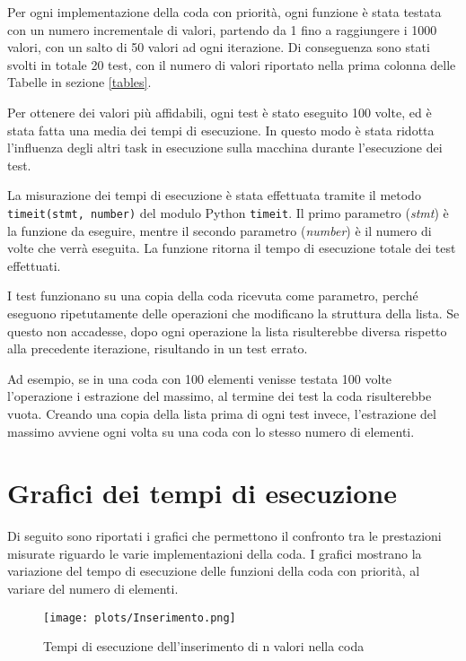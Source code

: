 \documentclass{article}
\begin{document}
Per ogni implementazione della coda con priorità, ogni funzione è stata testata con un numero incrementale di valori, partendo da 1 fino a raggiungere i 1000 valori, con un salto di 50 valori ad ogni iterazione. Di conseguenza sono stati svolti in totale 20 test, con il numero di valori riportato nella prima colonna delle Tabelle in sezione \ref{tables}.

\vspace{5pt}
Per ottenere dei valori più affidabili, ogni test è stato eseguito 100 volte, ed è stata fatta una media dei tempi di esecuzione. In questo modo è stata ridotta l'influenza degli altri task in esecuzione sulla macchina durante l'esecuzione dei test.

\vspace{5pt}
La misurazione dei tempi di esecuzione è stata effettuata tramite il metodo \verb|timeit(stmt, number)| del modulo Python \verb|timeit|. Il primo parametro (\emph{stmt}) è la funzione da eseguire, mentre il secondo parametro (\emph{number}) è il numero di volte che verrà eseguita. La funzione ritorna il tempo di esecuzione totale dei test effettuati.

\vspace{5pt}
I test funzionano su una copia della coda ricevuta come parametro, perché eseguono ripetutamente delle operazioni che modificano la struttura della lista. Se questo non accadesse, dopo ogni operazione la lista risulterebbe diversa rispetto alla precedente iterazione, risultando in un test errato.

Ad esempio, se in una coda con 100 elementi venisse testata 100 volte l'operazione i estrazione del massimo, al termine dei test la coda risulterebbe vuota. Creando una copia della lista prima di ogni test invece, l'estrazione del massimo avviene ogni volta su una coda con lo stesso numero di elementi.

\section{Grafici dei tempi di esecuzione}\label{grafici}

Di seguito sono riportati i grafici che permettono il confronto tra le prestazioni misurate riguardo le varie implementazioni della coda.
I grafici mostrano la variazione del tempo di esecuzione delle funzioni della coda con priorità, al variare del numero di elementi.

\begin{figure}[h]
    \texttt{[image: plots/Inserimento.png]}
    \centering
    \caption{Tempi di esecuzione dell'inserimento di n valori nella coda}
    \label{fig:plot_insert}
\end{figure}
\end{document}
